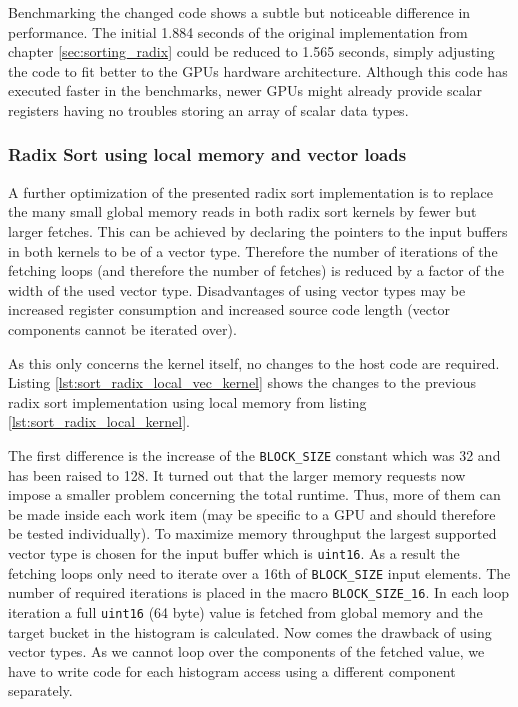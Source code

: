 Benchmarking the changed code shows a subtle but noticeable difference in performance. The initial 1.884 seconds of the original implementation from chapter \ref{sec:sorting_radix} could be reduced to 1.565 seconds, simply adjusting the code to fit better to the GPUs hardware architecture. Although this code has executed faster in the benchmarks, newer GPUs might already provide scalar registers having no troubles storing an array of scalar data types.

\subsubsection{Radix Sort using local memory and vector loads}
\label{sec:sorting_radix_local_vec}

A further optimization of the presented radix sort implementation is to replace the many small global memory reads in both radix sort kernels by fewer but larger fetches. This can be achieved by declaring the pointers to the input buffers in both kernels to be of a vector type. Therefore the number of iterations of the fetching loops (and therefore the number of fetches) is reduced by a factor of the width of the used vector type. Disadvantages of using vector types may be increased register consumption and increased source code length (vector components cannot be iterated over).

As this only concerns the kernel itself, no changes to the host code are required. Listing \ref{lst:sort_radix_local_vec_kernel} shows the changes to the previous radix sort implementation using local memory from listing \ref{lst:sort_radix_local_kernel}.



The first difference is the increase of the \lstinline!BLOCK_SIZE! constant which was 32 and has been raised to 128. It turned out that the larger memory requests now impose a smaller problem concerning the total runtime. Thus, more of them can be made inside each work item (may be specific to a GPU and should therefore be tested individually). To maximize memory throughput the largest supported vector type is chosen for the input buffer which is \lstinline!uint16!. As a result the fetching loops only need to iterate over a 16th of \lstinline!BLOCK_SIZE! input elements. The number of required iterations is placed in the macro \lstinline!BLOCK_SIZE_16!. In each loop iteration a full \lstinline!uint16! (64 byte) value is fetched from global memory and the target bucket in the histogram is calculated. Now comes the drawback of using vector types. As we cannot loop over the components of the fetched value, we have to write code for each histogram access using a different component separately.

